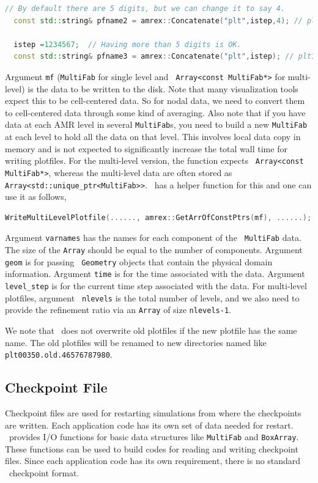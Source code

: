 {{\begin{lstlisting}[language=cpp]
  // By default there are 5 digits, but we can change it to say 4.
  const std::string& pfname2 = amrex::Concatenate("plt",istep,4); // plt0258  

  istep =1234567;  // Having more than 5 digits is OK.
  const std::string& pfname3 = amrex::Concatenate("plt",istep); // plt12344567
\end{lstlisting}
Argument {\tt mf} ({\tt MultiFab} for single level and {\tt
  Array<const MultiFab*>} for multi-level) is the data to be written
to the disk.  Note that many visualization tools expect this to be
cell-centered data.  So for nodal data, we need to convert them to
cell-centered data through some kind of averaging.  Also note that if
you have data at each AMR level in several {\tt MultiFab}s, you need
to build a new {\tt MultiFab} at each level to hold all the data on
that level.  This involves local data copy in memory and is not
expected to significantly increase the total wall time for writing
plotfiles.  For the multi-level version, the function expects {\tt
  Array<const MultiFab*>}, whereas the multi-level data are often
stored as {\tt Array<std::unique\_ptr<MultiFab>>}.  \amrex\ has a
helper function for this and one can use it as follows,
\begin{lstlisting}[language=cpp]
   WriteMultiLevelPlotfile(......, amrex::GetArrOfConstPtrs(mf), ......);
\end{lstlisting}
Argument {\tt varnames} has the names for each component of the {\tt
MultiFab} data.  The size of the {\tt Array} should be equal to the
number of components.  Argument {\tt geom} is for passing {\tt
Geometry} objects that contain the physical domain
information. Argument {\tt time} is for the time associated with the
data.  Argument {\tt level\_step} is for the current time step
associated with the data.  For multi-level plotfiles, argument {\tt
nlevels} is the total number of levels, and we also need to provide
the refinement ratio via an {\tt Array} of size {\tt nlevels-1}.

We note that \amrex\ does not overwrite old plotfiles if the new
plotfile has the same name.  The old plotfiles will be renamed to
new directories named like {\tt plt00350.old.46576787980}.

\subsection{Checkpoint File}

Checkpoint files are used for restarting simulations from where the
checkpoints are written.  Each application code has its own set of
data needed for restart.  \amrex\ provides I/O functions for basic
data structures like {\tt MultiFab} and {\tt BoxArray}.  These
functions can be used to build codes for reading and writing
checkpoint files.  Since each application code has its own
requirement, there is no standard \amrex\ checkpoint format.

}}
